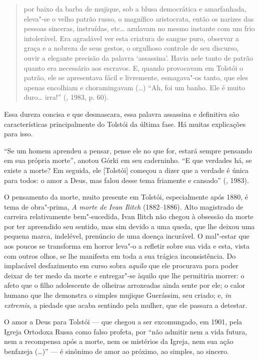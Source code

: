 \begin{quotation}
por baixo da barba de mujique, sob a blusa democrática e amarfanhada, eleva"-se o velho patrão russo, o magnífico aristocrata, então os narizes das pessoas sinceras, instruídas, etc\ldots{} azulavam no mesmo instante com um frio intolerável. Era agradável ver esta criatura de sangue puro, observar a graça e a nobreza de seus gestos, o orgulhoso controle de seu discurso, ouvir a
elegante precisão da palavra `assassina'. Havia nele tanto de patrão quanto era necessário aos escravos. E, quando provocavam em Tolstói o patrão, ele se apresentava fácil e livremente, esmagava"-os tanto, que eles apenas encolhiam e choramingavam (\ldots{}) ``Ah, foi um banho. Ele é muito duro\ldots{} irra!'' (, 1983, p. 60).
\end{quotation}

Essa dureza concisa e que desmascara, essa palavra
assassina e definitiva são características principalmente do Tolstói
da última fase. Há muitas explicações para isso.

``Se um homem aprendeu a pensar, pense ele no que
for, estará sempre pensando em sua própria morte'', anotou Górki em
seu caderninho. ``E que verdades há, se existe a morte? Em seguida,
ele [Tolstói] começou a dizer que a verdade é única para todos: o
amor a Deus, mas falou desse tema friamente e cansado'' (, 1983).

O pensamento da morte, muito presente em Tolstói, especialmente após 1880, é tema de obra"-prima, \emph{A morte de Ivan Ilitch} (1882--1886). Alto magistrado de carreira relativamente bem"-sucedida, Ivan Ilitch não chegou à obsessão da morte por ter apreendido seu sentido, mas sim devido a uma queda, que lhe deixou uma pequena marca, indelével, prenúncio de uma doença incurável. O mal"-estar que aos poucos se transforma em horror leva"-o a refletir sobre sua vida e esta, vista com outros olhos, se
lhe manifesta em toda a sua trágica inconsistência. Do implacável desfazimento em curso sobra \emph{aquilo} que ele procurava
para poder deixar de ter medo da morte e entregar"-se àquilo que lhe permitiria morrer: o afeto que o filho adolescente de olheiras
arroxeadas ainda sente por ele; o calor humano que lhe demonstra o simples mujique Guerássim, seu criado; e, \emph{in extremis}, a
piedade que acaba sentindo pela mulher, que ele passara a detestar.

O amor a Deus para Tolstói --- que chegou a ser excomungado, em 1901, pela
Igreja Ortodoxa Russa como falso profeta,
por ``não admitir nem a vida futura, nem a recompensa após a
morte, nem os mistérios da Igreja, nem sua ação benfazeja (\ldots{})'' --- é
sinônimo de amor ao próximo, ao simples, ao sincero.

